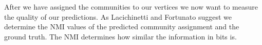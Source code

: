After we have assigned the communities to our vertices we now want to measure 
the quality of our predictions. As Lacichinetti and Fortunato 
suggest\cite{LF09} we determine the NMI values of the predicted community 
assignment and the ground truth. The NMI determines how similar the 
information in bits is.